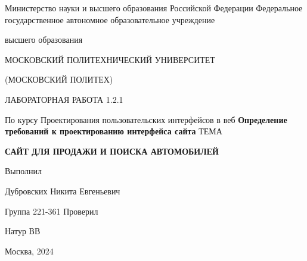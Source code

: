 \singlespacing

\newpage
\begin{center}
    Министерство науки и высшего образования Российской Федерации
    Федеральное государственное автономное образовательное учреждение

    высшего образования

    \guillemotleft МОСКОВСКИЙ ПОЛИТЕХНИЧЕСКИЙ УНИВЕРСИТЕТ\guillemotright

    (МОСКОВСКИЙ ПОЛИТЕХ)
\end{center}
\noindent
\bigbreak
\bigbreak
\bigbreak
\bigbreak
\begin{center}
    ЛАБОРАТОРНАЯ РАБОТА 1.2.1

    По курсу Проектирования пользовательских интерфейсов в веб
    \textbf{Определение требований к проектированию интерфейса сайта}
    \bigbreak
    \bigbreak
    \bigbreak
    \bigbreak
    ТЕМА

    \guillemotleft\textbf{САЙТ ДЛЯ ПРОДАЖИ И ПОИСКА АВТОМОБИЛЕЙ}\guillemotright
\end{center}
\noindent
\bigbreak
\bigbreak
\bigbreak
\bigbreak
\bigbreak
\bigbreak
\bigbreak
\bigbreak
\bigbreak
\bigbreak
\hfill Выполнил

\hfill Дубровских Никита Евгеньевич

\hfill Группа 221-361
\bigbreak
\bigbreak
\bigbreak
\hfill Проверил

\hfill Натур ВВ
\vfill
\begin{center}
    Москва, 2024
\end{center}
\newpage
\onehalfspacing
